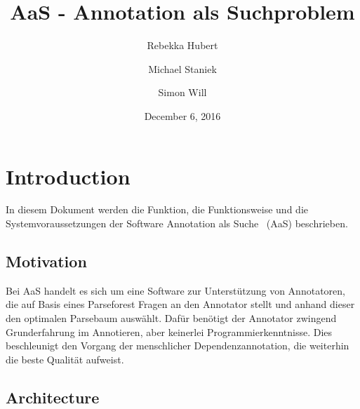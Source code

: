 \documentclass{scrartcl}
\title{AaS - Annotation als Suchproblem}
\author{Rebekka Hubert \and Michael Staniek \and Simon Will}
\date{December 6, 2016}
\begin{document}
\maketitle

\section{Introduction}
\label{sec:Introduction}
In diesem Dokument werden die Funktion, die Funktionsweise und die Systemvoraussetzungen der Software \glqq Annotation als Suche\grqq~ (AaS) beschrieben.
\subsection{Motivation}
\label{sub:Motivation}
Bei AaS handelt es sich um eine Software zur Unterstützung von Annotatoren, die auf Basis eines Parseforest Fragen an den Annotator stellt und anhand dieser den optimalen Parsebaum auswählt. Dafür benötigt der Annotator zwingend Grunderfahrung im Annotieren, aber keinerlei Programmierkenntnisse. Dies beschleunigt den Vorgang der  menschlicher Dependenzannotation, die weiterhin die beste Qualität aufweist.

\subsection{Architecture}
\label{sub:Architecture}
\end{document}
